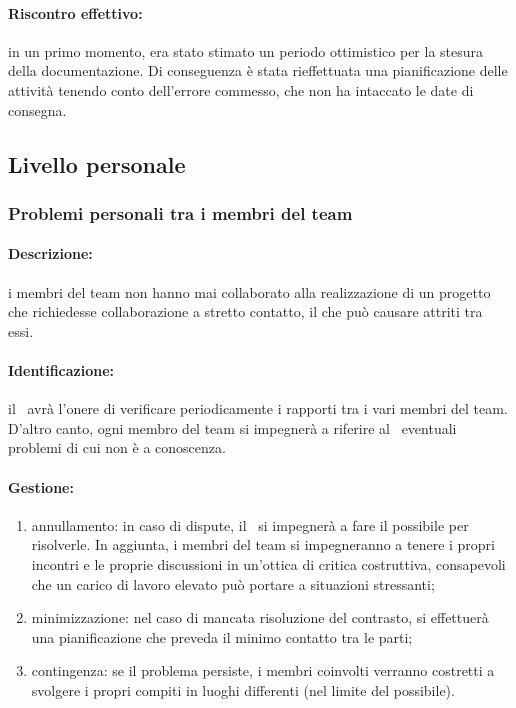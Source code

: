 \documentclass[../PianoProgetto.tex]{subfiles}
\begin{document}
	\paragraph*{Riscontro effettivo:} in un primo momento, era stato stimato un periodo ottimistico per la stesura della documentazione. Di conseguenza è stata rieffettuata una pianificazione delle attività tenendo conto dell'errore commesso, che non ha intaccato le date di consegna.


\subsection{Livello personale}

\subsubsection{Problemi personali tra i membri del team}

	\paragraph*{Descrizione:} i membri del team non hanno mai collaborato alla realizzazione di un progetto che richiedesse collaborazione a stretto contatto, il che può causare attriti tra essi.
	
	\paragraph*{Identificazione:} il \responsabilediprogetto\ avrà l'onere di verificare periodicamente i rapporti tra i vari membri del team. D'altro canto, ogni membro del team si impegnerà a riferire al \responsabilediprogetto\ eventuali problemi di cui non è a conoscenza.
	
	\paragraph*{Gestione:}
	\begin{enumerate}
		\item annullamento: in caso di dispute, il \responsabilediprogetto\ si impegnerà a fare il possibile per risolverle. In aggiunta, i membri del team si impegneranno a tenere i propri incontri e le proprie discussioni in un'ottica di critica costruttiva, consapevoli che un carico di lavoro elevato può portare a situazioni stressanti;
		\item minimizzazione: nel caso di mancata risoluzione del contrasto, si effettuerà una pianificazione che preveda il minimo contatto tra le parti; 
		\item contingenza: se il problema persiste, i membri coinvolti verranno costretti a svolgere i propri compiti in luoghi differenti (nel limite del possibile).
	\end{enumerate}	
	
\end{document}
